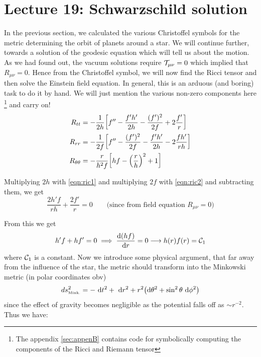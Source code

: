 \section*{Lecture 19: Schwarzschild solution}
In the previous section, we calculated the various Christoffel symbols for the metric determining the orbit of planets around a star. We will continue further, towards a solution of the geodesic equation which will tell us about the motion.\\[0.2cm] As we had found out, the vacuum solutions require $\mathcal T_{\mu\nu} = 0$ which implied that $R_{\mu\nu}=0$. Hence from the Christoffel symbol, we will now find the Ricci tensor and then solve the Einstein field equation. In general, this is an arduous (and boring) task to do it by hand. We will just mention the various non-zero components here \footnote{The appendix \ref{sec:appenB} contains code for symbolically computing the components of the Ricci and Riemann tensor} and carry on!
\begin{align}
    R_{tt} &= -\frac{1}{2h}\qty[f'' - \frac{f'h'}{2h} - \frac{(f')^2}{2f} + 2\frac{f'}{r}] \label{eqn:ric1} \\
    R_{rr} &= -\frac{1}{2f}\qty[f'' - \frac{(f')^2}{2f} - \frac{f'h'}{2h} - 2\frac{fh'}{rh}] \label{eqn:ric2} \\
    R_{\theta\theta} &= -\frac{r}{h^2f}\qty[hf - \qty(\frac{r}{h})^2 +1] \label{eqn:ric3}
\end{align}

Multiplying $2h$ with \eqref{eqn:ric1} and multiplying $2f$ with \eqref{eqn:ric2} and subtracting them, we get
\[
\frac{2h'f}{rh} + \frac{2f'}{r} = 0
\qquad \text{(since from field equation $R_{\mu\nu}=0$)}
\]

From this we get $$h'f+hf'=0\implies \dv{(hf)}{r} = 0 \longrightarrow h(r)f(r) = \mathcal C_1 $$
where $\mathcal C_1$ is a constant. Now we introduce some physical argument, that far away from the influence of the star, the metric should transform into the Minkowski metric (in polar coordinates obv) $$ds_{\text{\tiny Mink.}}^2 = -\ \dd t^2 +\ \dd r^2+ r^2\qty(\dd \theta^2 + \sin^2\theta \ \dd \phi^2)$$ since the effect of gravity becomes negligible as the potential falls off as $\sim r^{-2}$.
Thus we have:


